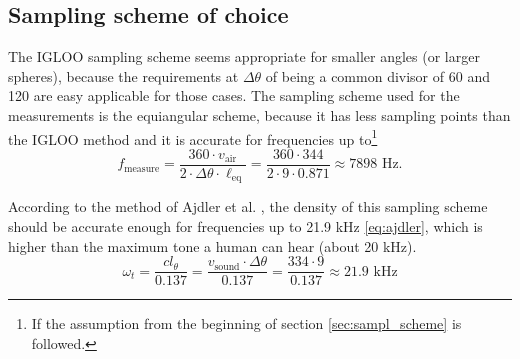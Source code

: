 \subsection{Sampling scheme of choice}
The IGLOO sampling scheme seems appropriate for smaller angles (or larger spheres), because the requirements at $\Delta\theta$ of being a common divisor of 60 and 120 are easy applicable for those cases.
The sampling scheme used for the measurements is the equiangular scheme, because it has less sampling points than the IGLOO method and it is accurate for frequencies up to\footnote{If the assumption from the beginning of section \ref{sec:sampl_scheme} is followed.}
\begin{equation*}
f_\text{measure}=\dfrac{360\cdot v_\text{air}}{2\cdot\Delta\theta\cdot\ell_\text{eq}}=\dfrac{360\cdot344}{2\cdot9\cdot0.871}\approx7898\text{ Hz.}
\end{equation*} 

According to the method of Ajdler et al. \cite[eq.~(5)]{Ajdler2005III273}, the density of this sampling scheme should be accurate enough for frequencies up to 21.9 kHz \eqref{eq:ajdler}, which is higher than the maximum tone a human can hear (about 20 kHz).
\begin{equation}
\label{eq:ajdler}
\omega_t=\dfrac{cl_\theta}{0.137}=\dfrac{v_\text{sound}\cdot\Delta\theta}{0.137}=\dfrac{334\cdot 9}{0.137}\approx 21.9 \text{ kHz}
\end{equation}